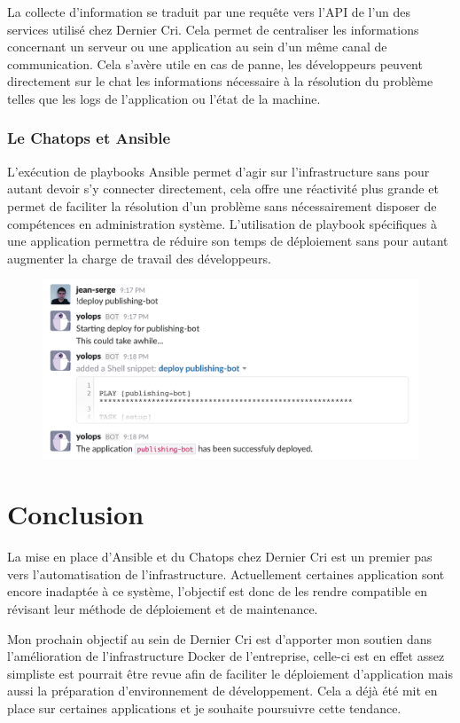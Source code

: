 \documentclass[11pt,a4paper]{article}
\begin{document}
  La collecte d'information se traduit par une requête vers l'API de l'un
  des services utilisé chez Dernier Cri. Cela permet de centraliser les
  informations concernant un serveur ou une application au sein d'un même
  canal de communication. Cela s'avère utile en cas de panne, les
  développeurs peuvent directement sur le chat les informations nécessaire
  à la résolution du problème telles que les logs de l'application ou
  l'état de la machine.

  \subsubsection{Le Chatops et Ansible}\label{le-chatops-et-ansible}

  L'exécution de playbooks Ansible permet d'agir sur l'infrastructure sans
  pour autant devoir s'y connecter directement, cela offre une réactivité
  plus grande et permet de faciliter la résolution d'un problème sans
  nécessairement disposer de compétences en administration système.
  L'utilisation de playbook spécifiques à une application permettra de
  réduire son temps de déploiement sans pour autant augmenter la charge de
  travail des développeurs.

  \begin{figure}[htbp]
  \centering
  \includegraphics{deploy.png}
  \caption{}
  \end{figure}

  \newpage

  \section{Conclusion}\label{conclusion}

  La mise en place d'Ansible et du Chatops chez Dernier Cri est un premier
  pas vers l'automatisation de l'infrastructure. Actuellement certaines
  application sont encore inadaptée à ce système, l'objectif est donc de
  les rendre compatible en révisant leur méthode de déploiement et de
  maintenance.

  \bigskip

  Mon prochain objectif au sein de Dernier Cri est d'apporter mon soutien
  dans l'amélioration de l'infrastructure Docker de l'entreprise, celle-ci
  est en effet assez simpliste est pourrait être revue afin de faciliter
  le déploiement d'application mais aussi la préparation d'environnement
  de développement. Cela a déjà été mit en place sur certaines
  applications et je souhaite poursuivre cette tendance.
\end{document}
